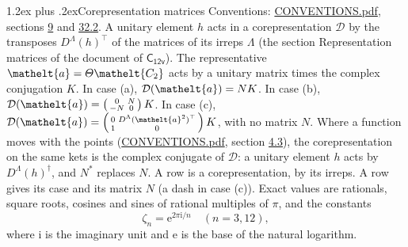 \documentclass[10pt,a4paper]{article}
\makeatletter
\renewcommand\section{\@startsection{section}{1}{\z@}{-3ex plus -1ex minus -.2ex}%
  {1.2ex plus .2ex}{\normalfont\large\sffamily\bfseries\color{parttitle}}}
\numberwithin{equation}{section}
\newcommand{\eltfont}[1]{{\let\sigma\eltsigma\mathelt{#1}}}
\newcommand{\grp}[1]{\mathsf{#1}}
\newcommand{\elt}[1]{\eltfont{#1}}
\newcommand{\iunit}{\mathrm{i}}
\newcommand{\expe}{\mathrm{e}}
\newcommand{\rootunity}[1]{\zeta_{#1}}
\makeatother
\begin{document}
\section{Corepresentation matrices}\label{s:corep_matrices}
Conventions: \href{../../CONVENTIONS.pdf}{CONVENTIONS.pdf}, sections \href{../../../rotation/CONVENTIONS.pdf\#conv.9}{9} and \href{../../CONVENTIONS.pdf\#conv.32.2}{32.2}.
A unitary element $h$ acts in a corepresentation $\mathcal{D}$ by the transposes $D^{\Lambda}(h)^{\top}$ of the matrices of its irreps $\Lambda$ (the section Representation matrices of the document of \href{../../../rotation/data/pdf/C12v.pdf}{$\grp{C_{12v}}$}). The representative $\elt{a} = \varTheta\elt{C_{2}}$ acts by a unitary matrix times the complex conjugation $K$.
In case (a), $\mathcal{D}(\elt{a}) = NK$. In case (b), $\mathcal{D}(\elt{a}) = \left(\begin{smallmatrix} 0 & N \\ -N & 0 \end{smallmatrix}\right) K$. In case (c), $\mathcal{D}(\elt{a}) = \left(\begin{smallmatrix} 0 & D^{\Lambda}(\elt{a}^2)^{\top} \\ 1 & 0 \end{smallmatrix}\right) K$, with no matrix $N$.
Where a function moves with the points (\href{../../CONVENTIONS.pdf}{CONVENTIONS.pdf}, section \href{../../../rotation/CONVENTIONS.pdf\#conv.4.3}{4.3}), the corepresentation on the same kets is the complex conjugate of $\mathcal{D}$: a unitary element $h$ acts by $D^{\Lambda}(h)^{\dagger}$, and $N^{*}$ replaces $N$.
A row is a corepresentation, by its irreps. A row gives its case and its matrix $N$ (a dash in case (c)).
\leavevmode\label{n:constant.root}\label{n:index.root.order}Exact values are rationals, square roots, cosines and sines of rational multiples of $\pi$, and the constants
\begin{equation}\label{e:constants}\rootunity{n} = \expe^{2\pi\iunit/n}\quad(n = 3, 12),\end{equation}
where $\iunit$ is the imaginary unit and $\expe$ is the base of the natural logarithm.
\end{document}
